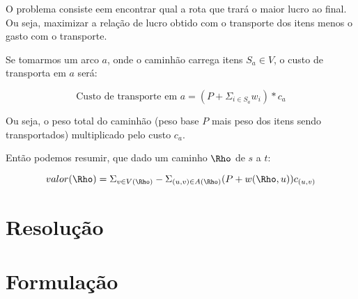 \documentclass[conference]{IEEEtran}
\begin{document}
    O problema consiste eem encontrar qual a rota que trará o maior lucro ao final. Ou seja, maximizar a relação de lucro obtido com o transporte dos itens menos o gasto com o transporte.

    Se tomarmos um arco $a$, onde o caminhão carrega itens $S_a \in V$, o custo de transporta em $a$ será:

    \begin{equation}
        \text{Custo de transporte em } a = (P + \Sigma_{i \in S_a} w_i) * c_a
    \end{equation}

    Ou seja, o peso total do caminhão (peso base $P$ mais peso dos itens sendo transportados) multiplicado pelo custo $c_a$.

    Então podemos resumir, que dado um caminho $\Rho$ de $s$ a $t$:

    \begin{equation}
        valor(\Rho) = \Sigma_{v \in V(\Rho)} - \Sigma_{(u,v) \in A(\Rho)} (P + w(\Rho, u))c_{(u,v)}
    \end{equation}

\section {Resolução}


\newpage
\section {Formulação}
\end{document}
